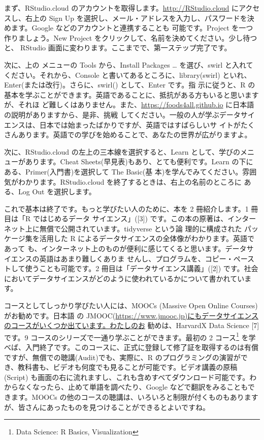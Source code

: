 \documentclass[
]{bxjsbook}
\theoremstyle{definition}
\theoremstyle{definition}
\theoremstyle{definition}
\theoremstyle{definition}
\theoremstyle{remark}
\begin{document}
まず、RStudio.cloud のアカウントを取得します。\url{http://RStudio.cloud} にアクセスし、右上の Sign Up を選択し、メール・アドレスを入力し、パスワードを決めます。Google などのアカウントと連携することも 可能です。Project を一つ作りましょう。New Project をクリックして、名前を決めてください。少し待つと、 RStudio 画面に変わります。ここまでで、第一ステップ完了です。

次に、上の メニューの Tools から、Install Packages \ldots{} を選び、swirl と入れてください。それから、Console と書いてあるところに、library(swirl) といれ、Enter(または改行)。さらに、swirl() として、Enter です。指 示に従うと、R の基本を学ぶことができます。英語であることに、抵抗がある方もいると思いますが、それほ ど難しくはありません。また、\url{https://foods4all.github.io} に日本語の説明がありますから、是非、挑戦 してください。一般の人が学ぶデータサイエンスは、日本では始まったばかりですが、英語ではすばらしいサ イトがたくさんあります。英語での学びを始めることで、あなたの世界が広がりますよ。

次に、RStudio.cloud の左上の三本線を選択すると、Learn として、学びのメニューがあります。Cheat Sheets(早見表)もあり、とても便利です。Learn の下にある、Primer(入門書)を選択して The Basic(基 本)を学んでみてください。雰囲気がわかります。RStudio.cloud を終了するときは、右上の名前のところに ある、Log Out を選択します。

これで基本は終了です。もっと学びたい人のために、本を 2 冊紹介します。1 冊目は「R ではじめるデータ サイエンス」({[}3{]}) です。この本の原著は、インターネット上に無償で公開されています。tidyverse という論 理的に構成された パッケージ集を活用した R によるデータサイエンスの全体像がわかります。英語であって も、インターネット上のものが便利に感じてくると思います。データサイエンスの英語はあまり難しくありま せんし、プログラムを、コピー・ペーストして使うことも可能です。2 冊目は「データサイエンス講義」({[}2{]}) です。社会においてデータサイエンスがどのように使われているかについて書かれています。

コースとしてしっかり学びたい人には、MOOCs (Massive Open Online Courses) がお勧めです。日本語 の JMOOC(\url{https://www.jmooc.jp)にもデータサイエンスのコースがいくつか出ています。わたしのお} 勧めは、HarvardX Data Science {[}7{]} です。9 コースのシリーズで一通り学ぶことができます。最初の 2 コース\footnote{Data Science: R Basics, Visualization} を学べば、入門終了です。このコースに、正式に登録して修了証を取得するのは有償ですが、無償での聴講(Audit)でも、実際に、R のプログラミングの演習ができ、教科書も、ビデオも何度でも見ることが可能です。ビデオ講義の原稿 (Script) も画面の右に流れますし、これも含めすべてダウンロード可能です。わからなくなったら、止めて単語を調べたり、Google などで翻訳をみることもできます。MOOCs の他のコースの聴講は、いろいろと制限が付くものもありますが、皆さんにあったものを見つけることができるとよいですね。
\end{document}
